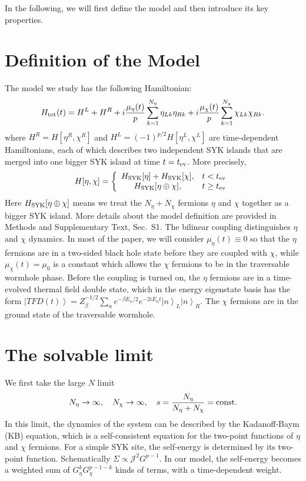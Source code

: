 \documentclass[pdflatex,sn-nature]{sn-jnl}
\begin{document}
In the following, we will first define the model and then introduce its key properties.

\section{Definition of the Model}
The model we study has the following Hamiltonian:
\begin{equation}
H_{\rm tot}(t)=H^L+H^R
+i\frac{\mu_\eta(t)}{p}\sum_{k=1}^{N_\eta}\eta_{Lk}\eta_{Rk}
+i\frac{\mu_\chi(t)}{p}\sum_{k=1}^{N_\chi}\chi_{Lk}\chi_{Rk}.
\end{equation}
where $H^R=H[\eta^R,\chi^R]$ and $H^L=(-1)^{p/2}H[\eta^L,\chi^L]$ are time-dependent Hamiltonians, each of which describes two independent SYK islands that are merged into one bigger SYK island at time $t=t_{\rm ev}$. More precisely,
\begin{align}
	H[\eta,\chi]=\left\{\begin{array}{cc}H_{\rm SYK}[\eta]+H_{\rm SYK}[\chi],&t<t_{\rm ev}\\
										H_{\rm SYK}[\eta\oplus \chi],&t\geq t_{\rm ev}\end{array}\right.
\end{align}
Here $H_{\rm SYK}[\eta\oplus \chi]$ means we treat the $N_\eta+N_\chi$ fermions $\eta$ and $\chi$ together as a bigger SYK island. More details about the model definition are provided in Methods and Supplementary Text, Sec.~S1. The bilinear coupling distinguishes $\eta$ and $\chi$ dynamics. In most of the paper, we will consider $\mu_\eta(t)\equiv 0$ so that the $\eta$ fermions are in a two-sided black hole state before they are coupled with $\chi$, while $\mu_\chi(t)=\mu_0$ is a constant which allows the $\chi$ fermions to be in the traversable wormhole phase\cite{maldacena2018eternal}. Before the coupling is turned on, the $\eta$ fermions are in a time-evolved thermal field double state, which in the energy eigenstate basis has the form $\left|TFD(t)\right\rangle=Z_\beta^{-1/2}\sum_n e^{-\beta E_n/2}e^{-2iE_nt}\left|n\right\rangle_L\left|n\right\rangle_R$. The $\chi$ fermions are in the ground state of the traversable wormhole.

\section{The solvable limit}
We first take the large $N$ limit
\begin{align}
N_\eta\rightarrow \infty,\quad N_\chi\rightarrow \infty,\quad s=\frac{N_\eta}{N_\eta+N_\chi}={\rm const}.
\end{align}
In this limit, the dynamics of the system can be described by the Kadanoff-Baym (KB) equation, which is a self-consistent equation for the two-point functions of $\eta$ and $\chi$ fermions. For a simple SYK site, the self-energy is determined by its two-point function. Schematically $\Sigma\propto \mathcal{J}^2G^{p-1}$. In our model, the self-energy becomes a weighted sum of $G_\eta^kG_{\chi}^{p-1-k}$ kinds of terms, with a time-dependent weight.
\end{document}

